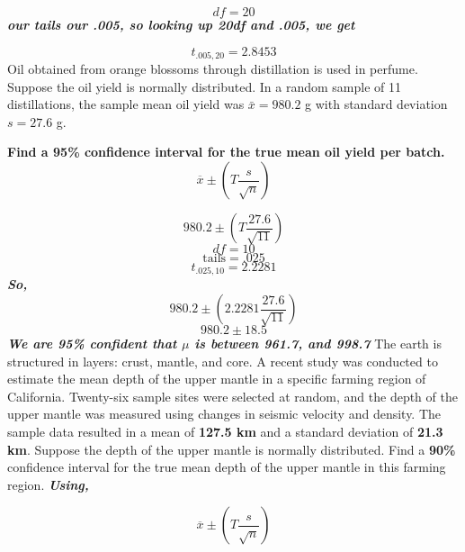 \documentclass{report}
\begin{document}
$$ df = 20$$
\textit{\textbf{our tails our .005, so looking up 20df and .005, we get}}

$$ t_{.005,20} = 2.8453$$
\bigbreak
\q
Oil obtained from orange blossoms through distillation is used in perfume. Suppose the oil yield is normally distributed. In a random sample of 11 distillations, the sample mean oil yield was $\bar{x} = 980.2$ g with standard deviation $s = 27.6$ g.
\vspace{1mm}

\noindent \textbf{Find a 95\% confidence interval for the true mean oil yield per batch.}
$$  \overline{x} \pm \left(T \frac{s}{\sqrt{n}}\right)$$

$$ 980.2 \pm \left(T \frac{27.6}{\sqrt{11}}\right)$$
$$ df = 10$$
$$\text{tails} = .025$$
$$ t_{.025,10} = 2.2281$$
\textit{\textbf{So,}}
$$ 980.2 \pm \left(2.2281 \frac{27.6}{\sqrt{11}}\right)$$
$$ 980.2 \pm 18.5$$
\textit{\textbf{We are 95\% confident that $\mu$ is between 961.7, and 998.7}}
\bigbreak \noindent
\q
The earth is structured in layers: crust, mantle, and core. A recent study was conducted to estimate the mean depth of the upper mantle in a specific farming region of California. Twenty-six sample sites were selected at random, and the depth of the upper mantle was measured using changes in seismic velocity and density. The sample data resulted in a mean of \textbf{127.5 km} and a standard deviation of \textbf{21.3 km}. Suppose the depth of the upper mantle is normally distributed. Find a \textbf{90\%} confidence interval for the true mean depth of the upper mantle in this farming region.
\bigbreak \noindent
\textit{\textbf{Using,}}

$$  \overline{x} \pm \left(T \frac{s}{\sqrt{n}}\right)$$
\end{document}

